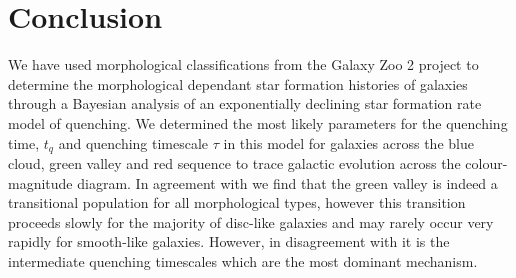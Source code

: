 \documentclass{mn2e}
\begin{document}
\section{Conclusion}
We have used morphological classifications from the Galaxy Zoo 2 project to determine the morphological dependant star formation histories of galaxies through a Bayesian analysis of an exponentially declining star formation rate model of quenching. We determined the most likely parameters for the quenching time, $t_q$ and quenching timescale $\tau$ in this model for galaxies across the blue cloud, green valley and red sequence to trace galactic evolution across the colour-magnitude diagram. In agreement with \citet{Sch2014} we find that the green valley is indeed a transitional population for all morphological types, however this transition proceeds slowly for the majority of disc-like galaxies and may rarely occur very rapidly for smooth-like galaxies. However, in disagreement with \citet{Sch2014} it is the intermediate quenching timescales which are the most dominant mechanism. 
\end{document}
